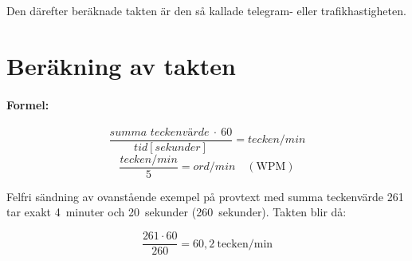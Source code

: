 Den därefter beräknade takten är den så kallade telegram- eller trafikhastigheten.

\newpage
\section[Taktberäkning]{Beräkning av takten}

\paragraph{Formel:}
\[\frac{\textit{summa\ teckenvärde}\ \cdot\ 60}{\textit{tid} [\textit{sekunder}]}
= \textit{tecken/min}\]
\[\frac{\textit{tecken/min}}{5} = \textit{ord/min}\quad (\text{WPM})\]

\begin{exempelbox}
Felfri sändning av ovanstående exempel på provtext  med
summa teckenvärde 261 tar exakt 4~minuter och 20~sekunder (260~sekunder).
Takten blir då:

$$\frac{261 \cdot 60}{260} = 60,2\ \mathrm{tecken/min}$$
\end{exempelbox}

\label{morsealfabetet}

